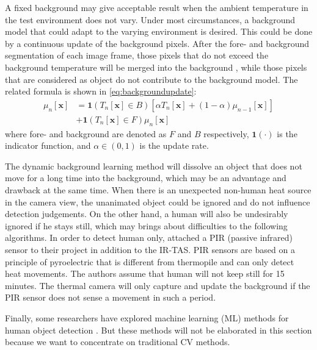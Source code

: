 A fixed background may give acceptable result when the ambient temperature in the test environment does not vary. Under most circumstances, a background model that could adapt to the varying environment is desired. This could be done by a continuous update of the background pixels. After the fore- and background segmentation of each image frame, those pixels that do not exceed the background temperature will be merged into the background \cite{melexis,IRTAS16x4}, while those pixels that are considered as object do not contribute to the background model. The related formula is shown in \autoref{eq:backgroundupdate}:
\begin{equation} \label{eq:backgroundupdate}
\begin{split}
\mu_n[\mathbf{x}] & = \mathbf{1}\left(T_n[\mathbf{x}]\in B\right)\left[\alpha T_n[\mathbf{x}]+(1-\alpha)\mu_{n-1}[\mathbf{x}]\right]
  \\&+\mathbf{1}\left(T_n[\mathbf{x}]\in F\right) \mu_n[\mathbf{x}]
\end{split}
\end{equation}
where fore- and background are denoted as $F$ and $B$ respectively, $\mathbf{1}(\cdot)$ is the indicator function, and $\alpha \in (0,1)$ is the update rate.

The dynamic background learning method will dissolve an object that does not move for a long time into the background, which may be an advantage and drawback at the same time. When there is an unexpected non-human heat source in the camera view, the unanimated object could be ignored and do not influence detection judgements. On the other hand, a human will also be undesirably ignored if he stays still, which may brings about difficulties to the following algorithms. In order to detect human only, \citeauthor{thermosense} \cite{thermosense} attached a PIR (passive infrared) sensor to their project in addition to the IR-TAS. PIR sensors are based on a principle of pyroelectric that is different from thermopile and can only detect heat movements. The authors assume that human will not keep still for 15 minutes. The thermal camera will only capture and update the background if the PIR sensor does not sense a movement in such a period.

Finally, some researchers have explored machine learning (ML) methods for human object detection \cite{multi,karayaneva2018use}. But these methods will not be elaborated in this section because we want to concentrate on traditional CV methods.

